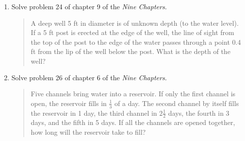 \begin{exercisessec}{}{}
\begin{enumerate}
	
	
		
		
		\item Solve problem 24 of chapter 9 of  the \emph{Nine Chapters.}
		\begin{quote}
			A deep well 5 ft in diameter is of unknown depth (to the water level). If a 5 ft post is erected at the edge of the well, the line of sight from the top of the post to the edge of the water passes through a point 0.4 ft from the lip of the well below the post. What is the depth of the well?
		\end{quote}
	  
	  
	  \item%
	  Solve problem 26 of chapter 6 of the \emph{Nine Chapters.}
	  \begin{quote}
	  	Five channels bring water into a reservoir. If only the first channel is open, the reservoir fills in $\frac 13$ of a day. The second channel by itself fills the reservoir in 1 day, the third channel in $2\frac 12$ days, the fourth in 3 days, and the fifth in 5 days. If all the channels are opened together, how long will the reservoir take to fill?
	  \end{quote}
	
	\end{enumerate}  

\end{exercisessec}